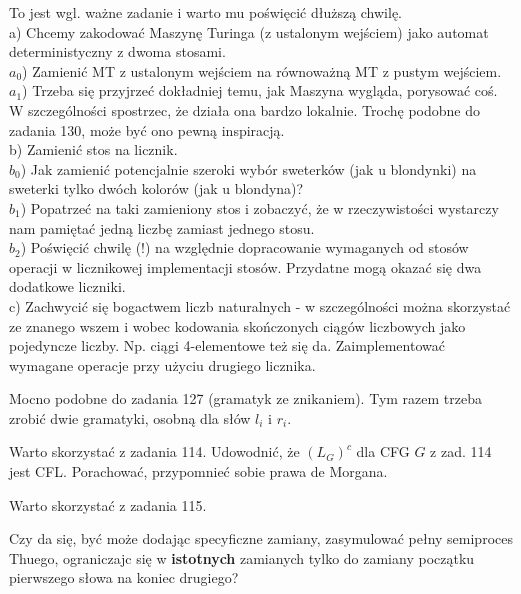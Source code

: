 \documentclass[a4paper,11pt]{article}
\newenvironment{zadanie}[1]
  {\renewcommand\theinnercustomthm{#1}\innercustomthm}
  {\endinnercustomthm}
\begin{document}
\begin{zadanie}{110}
To jest wgl. ważne zadanie i warto mu poświęcić dłuższą chwilę. \\
a) Chcemy zakodować Maszynę Turinga (z ustalonym wejściem) jako automat deterministyczny z dwoma stosami. \\
$a_0$) Zamienić MT z ustalonym wejściem na równoważną MT z pustym wejściem. \\
$a_1$) Trzeba się przyjrzeć dokładniej temu,
jak Maszyna wygląda, porysować coś. W szczególności spostrzec, że działa ona bardzo lokalnie. Trochę podobne do zadania 
130, może być ono pewną inspiracją. \\
b) Zamienić stos na licznik. \\
$b_0$) Jak zamienić potencjalnie szeroki wybór sweterków (jak u blondynki) na sweterki tylko dwóch kolorów (jak u blondyna)? \\
$b_1$) Popatrzeć na taki zamieniony stos i zobaczyć, że w rzeczywistości wystarczy nam pamiętać jedną liczbę zamiast jednego 
stosu. \\
$b_2$) Poświęcić chwilę (!) na względnie dopracowanie wymaganych od stosów operacji w licznikowej implementacji stosów. 
Przydatne mogą okazać się dwa dodatkowe liczniki. \\
c) Zachwycić się bogactwem liczb naturalnych - w szczególności można skorzystać ze znanego wszem i wobec kodowania
skończonych ciągów liczbowych jako pojedyncze liczby. Np. ciągi 4-elementowe też się da. Zaimplementować wymagane
operacje przy użyciu drugiego licznika.
\end{zadanie}

\begin{zadanie}{114}
Mocno podobne do zadania 127 (gramatyk ze znikaniem). Tym razem trzeba zrobić dwie gramatyki, osobną dla słów $l_i$ i $r_i$.
\end{zadanie}

\begin{zadanie}{115}
Warto skorzystać z zadania 114. Udowodnić, że $(L_G)^c$ dla CFG $G$ z zad. 114 jest CFL. Porachować, przypomnieć sobie prawa
de Morgana.
\end{zadanie}

\begin{zadanie}{116}
Warto skorzystać z zadania 115.
\end{zadanie}

\begin{zadanie}{118}
Czy da się, być może dodając specyficzne zamiany, zasymulować pełny semiproces Thuego, ograniczajc się w \textbf{istotnych} 
zamianych tylko do zamiany początku pierwszego słowa na koniec drugiego?
\end{zadanie}
\end{document}
